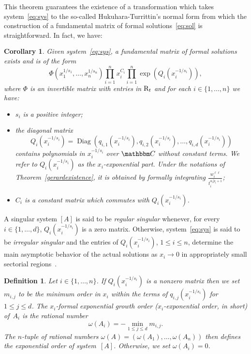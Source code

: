 \documentclass[final,1p,times,number,amsthm]{elsart}
\newtheorem{corollary}[lemma]{Corollary}
\newtheorem{definition}[lemma]{Definition}
\let\set\mathbbm
\begin{document}
This theorem guarantees the existence of a transformation which takes
system~\eqref{eq:sys} to the so-called Hukuhara-Turrittin's normal form from
which the construction of a fundamental matrix of formal
solutions~\eqref{eq:sol} is straightforward.  In fact, we have:
\begin{corollary}
  \label{gerardsol}
  Given system~\eqref{eq:sys}, a fundamental matrix of formal solutions exists
  and is of the form
  \begin{equation}
    \label{eq:sol}
    \Phi(x_1^{1/s_1}, \dots, x_n^{1/s_n} ) \prod_{i=1}^{n} x_{i}^{{C}_i}
    \prod_{i=1}^{n} \operatorname{exp}(Q_i(x_i^{-1/s_i})),
  \end{equation}
  where $\Phi$ is an invertible matrix with entries in ${\rm R}_t$ and for each
  $i \in \{1, \dots, n\}$ we have:
  \begin{itemize}
  \item $s_i$ is a positive integer;
  \item the diagonal matrix
    \[
    Q_i(x_i^{-1/s_i}) = \operatorname{Diag}\left(q_{i,1}(x_i^{-1/s_i}),
      q_{i,2}(x_i^{-1/s_i}), \dots, q_{i,d}(x_i^{-1/s_i})\right)
    \]
    contains polynomials in $x_i^{-1/s_i}$ over $\set C$
    without constant terms. We refer to $Q_i(x_i^{-1/s_i})$ as the
    $x_i$-exponential part. Under the notations of
    Theorem~\ref{gerardexistence}, it is obtained by formally integrating
    $\frac{w_{i}^{\ell\ell}}{t_i^{\alpha_i \tilde{p}_i +1}}$;
  \item $C_i $ is a constant matrix which commutes with
    $Q_i(x_i^{-1/s_i})$.
  \end{itemize}
\end{corollary}
A singular system $[A]$ is said to be \textit{regular singular} whenever, for every
$i \in \{1, \dots , d \}$, $Q_i(x_i^{-1/s_i})$ is a zero matrix.  Otherwise,
system~\eqref{eq:sys} is said to be \textit{irregular singular} and the entries
of $Q_i(x_i^{-1/s_i})$, $1\leq i \leq n$, determine the main asymptotic behavior
of the actual solutions as $x_i \rightarrow 0$ in appropriately small sectorial
regions~\cite[Proposition 5.2, pp 232, and Section~4]{key1}.
\begin{definition}
\label{katzpfaff}
Let $i \in \{1, \dots, n\}$. If $Q_i(x_i^{-1/s_i})$ is a nonzero matrix then we set $m_{i,j}$ to be the minimum order in $x_i$ within the terms
of
$q_{i,j}(x_i^{-1/s_i})$ for $1\leq j\leq d$. The $x_i$-\textit{formal exponential growth order}
($x_i$-exponential order, in short) of~$A_i$ is the rational number
$$\omega(A_i) = - \operatorname{min}_{1 \leq j \leq d}  m_{i,j}.$$
The $n$-tuple of rational numbers
$\omega(A) = (\omega(A_1), \dots, \omega(A_n))$ then defines the exponential
order of system~$[A]$. Otherwise, we set $\omega(A_i) =0$.
\end{definition}
\end{document}
